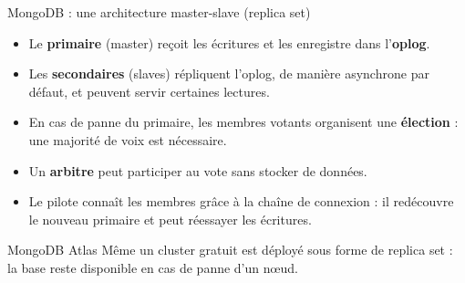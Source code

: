 \begin{frame}{MongoDB : une architecture master-slave (replica set)}
    \begin{itemize}
        \item Le \textbf{primaire} (master) reçoit les écritures et les
              enregistre dans l'\textbf{oplog}.
        \item Les \textbf{secondaires} (slaves) répliquent l'oplog, de manière
              asynchrone par défaut, et peuvent servir certaines lectures.
        \item En cas de panne du primaire, les membres votants organisent une
              \textbf{élection} : une majorité de voix est nécessaire.
        \item Un \textbf{arbitre} peut participer au vote sans stocker de
              données.
        \item Le pilote connaît les membres grâce à la chaîne de connexion : il
              redécouvre le nouveau primaire et peut réessayer les écritures.
    \end{itemize}

    \begin{examplebox}{MongoDB Atlas}
        Même un cluster gratuit est déployé sous forme de replica set : la base
        reste disponible en cas de panne d'un nœud.
    \end{examplebox}

\end{frame}

